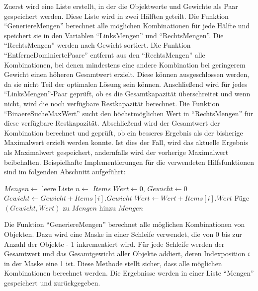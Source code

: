 Zuerst wird eine Liste erstellt, in der die Objektwerte und Gewichte als Paar gespeichert werden. Diese Liste wird in zwei Hälften geteilt. Die Funktion \enquote{GeneriereMengen} berechnet alle möglichen Kombinationen für jede Hälfte und speichert sie in den Variablen \enquote{LinksMengen} und \enquote{RechtsMengen}. Die \enquote{RechtsMengen} werden nach Gewicht sortiert. Die Funktion \enquote{EntferneDominiertePaare} entfernt aus den \enquote{RechtsMengen} alle Kombinationen, bei denen mindestens eine andere Kombination bei geringerem Gewicht einen höheren Gesamtwert erzielt. Diese können ausgeschlossen werden, da sie nicht Teil der optimalen Lösung sein können. Anschließend wird für jedes \enquote{LinksMengen}-Paar geprüft, ob es die Gesamtkapazität überschreitet und wenn nicht, wird die noch verfügbare Restkapazität berechnet. Die Funktion \enquote{BinaereSucheMaxWert} sucht den höchstmöglichen Wert in \enquote{RechtsMengen} für diese verfügbare Restkapazität. Abschließend wird der Gesamtwert der Kombination berechnet und geprüft, ob ein besseres Ergebnis als der bisherige Maximalwert erzielt werden konnte. Ist dies der Fall, wird das aktuelle Ergebnis als Maximalwert gespeichert, andernfalls wird der vorherige Maximalwert beibehalten. Beispielhafte Implementierungen für die verwendeten Hilfsfunktionen sind im folgenden Abschnitt aufgeführt:

\begin{algorithmic}
    \State \vspace{0.5em}
    
    \State $Mengen \leftarrow$ leere Liste
    \State $n \leftarrow$  $Items$  %
        \State $Wert \leftarrow 0$, $Gewicht \leftarrow 0$
                \State $Gewicht \leftarrow Gewicht + Items[i].Gewicht$
                \State $Wert \leftarrow Wert + Items[i].Wert$
            \EndIf
        \EndFor
        \State Füge $(Gewicht, Wert)$ zu $Mengen$ hinzu
    \EndFor
    \State \Return $Mengen$  %
    \EndFunction

\end{algorithmic}

Die Funktion \enquote{GeneriereMengen} berechnet alle möglichen Kombinationen von Objekten. Dazu wird eine Maske in einer Schleife verwendet, die von 0 bis zur Anzahl der Objekte - 1 inkrementiert wird. Für jede Schleife werden der Gesamtwert und das Gesamtgewicht aller Objekte addiert, deren Indexposition $ i $ in der Maske eine 1 ist. Diese Methode stellt sicher, dass alle möglichen Kombinationen berechnet werden. Die Ergebnisse werden in einer Liste \enquote{Mengen} gespeichert und zurückgegeben.

